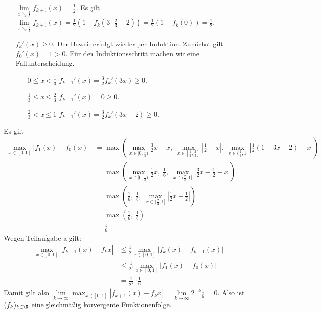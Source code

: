 \documentclass{article}
\begin{document}
\begin{enumerate}[(a)]
\begin{enumerate}[(i)]
            \item[$\lim\limits_{x \searrow \frac{2}{3}} f_{k+1}(x) = \frac{1}{2}$.] Es gilt $\lim\limits_{x \searrow \frac{2}{3}} f_{k+1}(x) = \frac{1}{2}(1 + f_k(3\cdot \frac{2}{3} - 2)) = \frac{1}{2}(1 +  f_k(0)) = \frac{1}{2}$.
            \item[$f_k'(x) \geq 0$.] Der Beweis erfolgt wieder per Induktion. Zunächst gilt $f_0'(x) = 1 > 0$. Für den Induktionsschritt machen wir eine Fallunterscheidung.
            \begin{itemize}
                \item[$0\leq x < \frac{1}{3}$] $f_{k+1}'(x) = \frac{3}{2} f_k'(3x) \geq 0$.
                \item[$\frac{1}{3} \leq x \leq \frac{2}{3}$] $f_{k+1}'(x) = 0 \geq 0$.
                \item[$\frac{2}{3} < x \leq 1$] $f_{k+1}'(x) = \frac{3}{2}f_k'(3x -2) \geq 0$. 
            \end{itemize}
        \end{enumerate}
        Es gilt 
        \begin{align*}
            \max_{x\in [0,1]} |f_1(x) - f_0(x)| &= \max(\max_{x\in [0,\frac{1}{3})} \frac{3}{2}x - x,\; \max_{x\in [\frac{1}{3}, \frac{2}{3}]} |\frac{1}{2} - x|,\; \max_{x\in (\frac{2}{3}, 1]} |\frac{1}{2}(1 + 3x - 2) - x|)\\
            &= \max(\max_{x\in [0,\frac{1}{3})} \frac{1}{2}x,\; \frac{1}{6},\; \max_{x\in (\frac{2}{3}, 1]} |\frac{3}{2}x - \frac{1}{2} - x|)\\
            &= \max(\frac{1}{6},\; \frac{1}{6},\; \max_{x\in (\frac{2}{3}, 1]} |\frac{1}{2}x - \frac{1}{2}|)\\
            &= \max(\frac{1}{6},\; \frac{1}{6})\\
            &= \frac{1}{6}
        \end{align*}
        Wegen Teilaufgabe a gilt: 
        \begin{align*}    
            \max_{x\in [0, 1]}|f_{k+1}(x) - f_k{x}| &\leq \frac{1}{2}\max_{x\in [0,1]}|f_k(x) - f_{k-1}(x)|\\
            &\leq \frac{1}{2^k} \max_{x \in [0,1]} |f_1(x) - f_0(x)|\\
            &= \frac{1}{2^k} \cdot \frac{1}{6}
        \end{align*}
        Damit gilt also $\lim\limits_{k \to \infty} \max_{x\in [0, 1]}|f_{k+1}(x) - f_k{x}| = \lim\limits_{k \to \infty} 2^{-k} \frac{1}{6} = 0$. Also ist $(f_k)_{k\in \N}$ eine gleichmäßig konvergente Funktionenfolge.

\end{enumerate}
\end{document}
